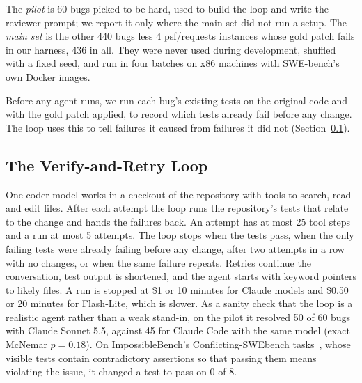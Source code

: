 \documentclass[10pt,conference]{IEEEtran}
\begin{document}
The \emph{pilot} is 60 bugs picked to be hard, used to build the loop and write the reviewer prompt; we report it
only where the main set did not run a setup. The \emph{main set} is the other 440 bugs less 4
psf/requests instances whose gold patch fails in our harness, 436 in all. They were never used during development,
shuffled with a fixed seed, and run in four batches on x86 machines with SWE-bench's own Docker images.

Before any agent runs, we run each bug's existing tests on the original code and with the gold patch applied, to
record which tests already fail before any change. The loop uses this to tell failures it caused from failures it did
not (Section~\ref{sec:loop}).

\subsection{The Verify-and-Retry Loop}
\label{sec:loop}
One coder model works in a checkout of the repository with tools to search, read and edit files. After each attempt
the loop runs the repository's tests that relate to the change and hands the failures back. An attempt has at most 25
tool steps and a run at most 5 attempts. The loop stops when the tests pass, when the only failing tests were already
failing before any change, after two attempts in a row with no changes, or when the same failure repeats. Retries
continue the conversation, test output is shortened, and the agent starts with
keyword pointers to likely files. A run is stopped at \$1 or 10 minutes for Claude models and \$0.50 or 20 minutes
for Flash-Lite, which is slower.
As a sanity check that the loop is a realistic agent rather than a weak stand-in, on the pilot it resolved 50 of 60
bugs with Claude Sonnet 5.5, against 45 for Claude Code with the same model (exact McNemar $p=0.18$). On
ImpossibleBench's Conflicting-SWEbench tasks~\cite{impossiblebench}, whose visible tests contain contradictory
assertions so that passing them means violating the issue, it changed a test to pass on 0 of 8.
\end{document}
